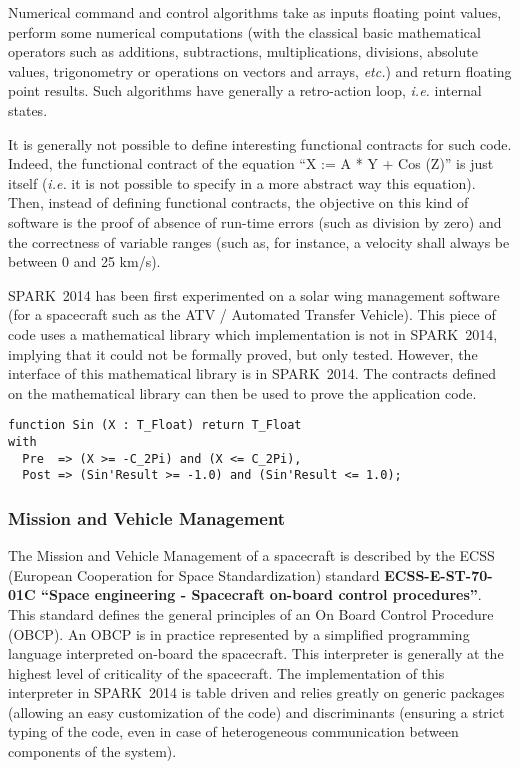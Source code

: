 \documentclass[10pt,a4paper,twocolumn]{article}
\newcommand{\newspark}{SPARK~2014\xspace}
\newcommand{\etc}{\textit{etc.}\xspace}
\newcommand{\ie}{\textit{i.e.}\xspace}
\begin{document}
Numerical command and control algorithms take as inputs floating point values,
perform some numerical computations (with the classical basic mathematical
operators such as additions, subtractions, multiplications, divisions, absolute
values, trigonometry or operations on vectors and arrays, \etc) and return
floating point results. Such algorithms have generally a retro-action loop, \ie
internal states.

It is generally not possible to define interesting functional contracts for
such code. Indeed, the functional contract of the equation
``X := A * Y + Cos (Z)''
is just itself (\ie it is not possible to specify in a more abstract way this
equation). Then, instead of defining functional contracts, the objective on
this kind of software is the proof of absence of run-time errors (such as
division by zero) and the correctness of variable ranges (such as, for
instance, a velocity shall always be between 0 and 25 km/s).

\newspark has been first experimented on a solar wing management software (for a spacecraft such as the ATV / Automated Transfer Vehicle).
This piece of code uses a mathematical library which implementation is not in \newspark, implying that it could not be formally proved, but only tested. However, the interface of this mathematical library is in \newspark. The contracts defined on the mathematical library can then be used to prove the application code.

\begin{lstlisting}
function Sin (X : T_Float) return T_Float
with
  Pre  => (X >= -C_2Pi) and (X <= C_2Pi),
  Post => (Sin'Result >= -1.0) and (Sin'Result <= 1.0);
\end{lstlisting}

\subsubsection{Mission and Vehicle Management}

The Mission and Vehicle Management of a spacecraft is described by the ECSS (European Cooperation for Space Standardization) standard
{\bf ECSS-E-ST-70-01C ``Space engineering - Spacecraft on-board control procedures''}.
This standard defines the general principles of an On Board Control Procedure
(OBCP). An OBCP is in practice represented by a simplified programming language
interpreted on-board the spacecraft. This interpreter is generally at the
highest level of criticality of the spacecraft. The implementation of this
interpreter in \newspark is table driven and relies greatly on generic packages
(allowing an easy customization of the code)
and discriminants
(ensuring a strict typing of the code, even in case of heterogeneous communication between components of the system).
\end{document}
